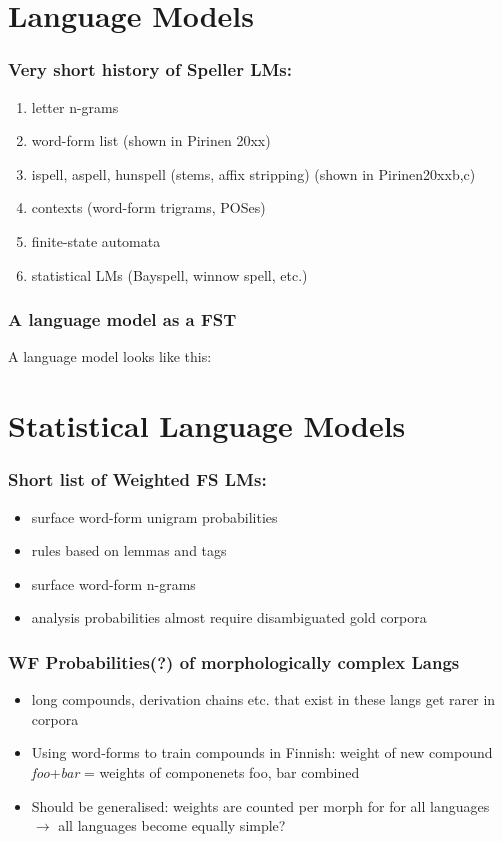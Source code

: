 \documentclass[t,12pt]{beamer}
\begin{document}
\section{Language Models}

\begin{frame}
    \frametitle{Very short history of Speller LMs:}
    \begin{enumerate}
        \item letter n-grams
        \item word-form list (shown in Pirinen 20xx)
        \item ispell, aspell, hunspell (stems, affix stripping)
            (shown in Pirinen20xxb,c)

        \item contexts (word-form trigrams, POSes)
        \item finite-state automata
        \item statistical LMs (Bayspell, winnow spell, etc.)
    \end{enumerate}
\end{frame}

\begin{frame}
    \frametitle{A language model as a FST}
    A language model looks like this:
\end{frame}

\section{Statistical Language Models}
\begin{frame}
    \frametitle{Short list of Weighted FS LMs:}
    \begin{itemize}
        \item surface word-form unigram probabilities
        \item rules based on lemmas and tags
        \item surface word-form n-grams
        \item analysis probabilities almost require disambiguated gold
            corpora
    \end{itemize}
\end{frame}

\begin{frame}
    \frametitle{WF Probabilities(?) of morphologically complex Langs}
    \begin{itemize}
        \item long compounds, derivation chains etc. that exist in these
            langs get rarer in corpora
        \item Using word-forms to train compounds in Finnish: 
            weight of new compound \emph{foo}+\emph{bar} = weights of componenets
            foo, bar combined
        \item Should be generalised: weights are counted per morph for for
            all languages $\rightarrow$ all languages become equally simple?
    \end{itemize}
\end{frame}
\end{document}
